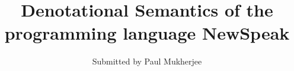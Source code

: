 \documentclass{article}
\begin{document}
\title{Denotational Semantics of the programming language NewSpeak}
\author{Submitted by Paul Mukherjee}
\maketitle

\begin{vdm}

\end{vdm}

\printindex
\end{document}
